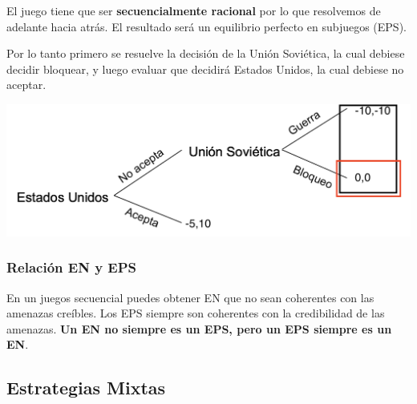 El juego tiene que ser \textbf{secuencialmente racional} por lo que resolvemos de adelante hacia atrás. El resultado será un equilibrio perfecto en subjuegos (EPS).

Por lo tanto primero se resuelve la decisión de la Unión Soviética, la cual debiese decidir bloquear, y luego evaluar que decidirá Estados Unidos, la cual debiese no aceptar. 

\begin{center}
    \includegraphics[scale = 0.50]{Figuras/Inducción.png}
\end{center}

\subsubsection*{Relación EN y EPS}

En un juegos secuencial puedes obtener EN que no sean coherentes con las amenazas creíbles. Los EPS siempre son coherentes con la credibilidad de las amenazas. \textbf{Un EN no siempre es un EPS, pero un EPS siempre es un EN}. 

\subsection{Estrategias Mixtas}